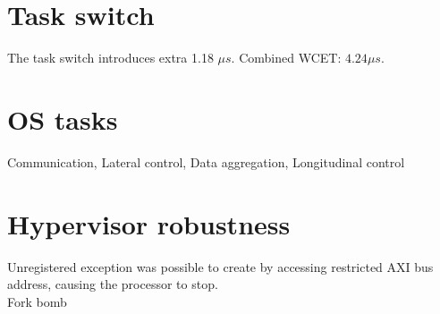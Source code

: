 \section{Task switch}
The task switch introduces extra 1.18 $\mu s$. Combined WCET: $4.24 \mu s$.

\section{OS tasks}
Communication, Lateral control, Data aggregation, Longitudinal control

\section{Hypervisor robustness}
Unregistered exception was possible to create by accessing restricted AXI bus address, causing the processor to stop.\\

Fork bomb
